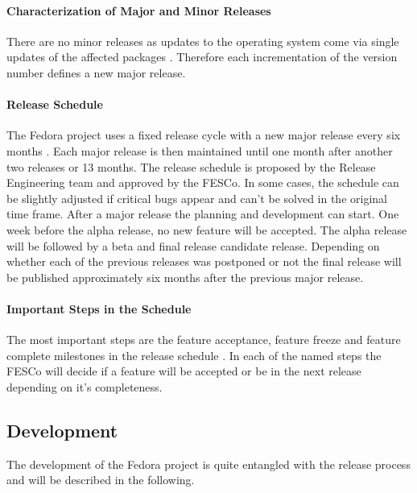 \paragraph{Characterization of Major and Minor Releases}

There are no minor releases as updates to the operating system come via single
updates of the affected packages
\cite{FedoraHistoricalSchedules,FedoraLifeCycle}. Therefore each incrementation
of the version number defines a new major release.

\paragraph{Release Schedule}

The Fedora project uses a fixed release cycle with a new major release every
six months \cite{FedoraLifeCycle,FedoraReleaseEngineering}. Each major release
is then maintained until one month after another two releases or 13 months. The
release schedule is proposed by the Release Engineering team and approved by
the \ac{FESCo}. In some cases, the schedule can be slightly adjusted if
critical bugs appear and can't be solved in the original time frame. After a
major release the planning and development can start. One week before the alpha
release, no new feature will be accepted. The alpha release will be followed by
a beta and final release candidate release. Depending on whether each of the
previous releases was postponed or not the final release will be published
approximately six months after the previous major release.

\paragraph{Important Steps in the Schedule}

The most important steps are the feature acceptance, feature freeze and feature
complete milestones in the release schedule \cite{FedoraLifeCycle}. In each of
the named steps the \ac{FESCo} will decide if a feature will be accepted or be
in the next release depending on it's completeness.

\subsection{Development}

The development of the Fedora project is quite entangled with the release
process and will be described in the following.

